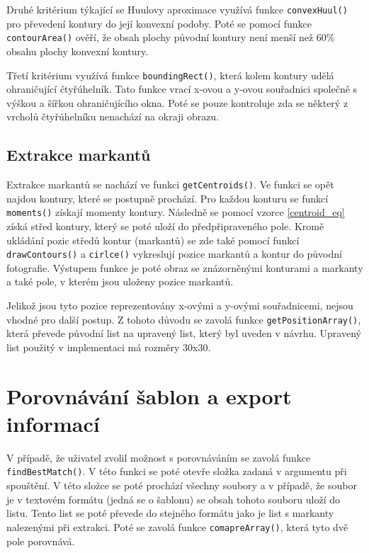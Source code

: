 Druhé kritérium týkající se Huulovy aproximace využívá funkce \texttt{convexHuul()} pro převedení kontury do její konvexní podoby. Poté se pomocí funkce \texttt{contourArea()} ověří, že obsah plochy původní kontury není menší než 60\% obsahu plochy konvexní kontury.

Třetí kritérium využívá funkce \texttt{boundingRect()}, která kolem kontury udělá ohraničující čtyřúhelník. Tato funkce vrací x-ovou a y-ovou souřadnici společně s výškou a šířkou ohraničujícího okna. Poté se pouze kontroluje zda se některý z vrcholů čtyřúhelníku nenachází na okraji obrazu. 


\subsection{Extrakce markantů}

Extrakce markantů se nachází ve funkci \texttt{getCentroids()}. Ve funkci se opět najdou kontury, které se postupně prochází. Pro každou konturu se funkcí \texttt{moments()} získají momenty kontury. Následně se pomocí vzorce \ref{centroid_eq} získá střed kontury, který se poté uloží do předpřipraveného pole. Kromě ukládání pozic středů kontur (markantů) se zde také pomocí funkcí \texttt{drawContours()} a \texttt{cirlce()} vykreslují pozice markantů a kontur do původní fotografie. Výstupem funkce je poté obraz se znázorněnými konturami a markanty a také pole, v kterém jsou uloženy pozice markantů.

Jelikož jsou tyto pozice reprezentovány x-ovými a y-ovými souřadnicemi, nejsou vhodné pro další postup. Z tohoto důvodu se zavolá funkce \texttt{getPositionArray()}, která převede původní list na upravený list, který byl uveden v návrhu. Upravený list použitý v implementaci má rozměry 30x30.



\section{Porovnávání šablon a export informací}
V případě, že uživatel zvolil možnost s porovnáváním se zavolá funkce \texttt{findBestMatch()}. V této funkci se poté otevře složka zadaná v argumentu při spouštění. V této složce se poté prochází všechny soubory a v případě, že soubor je v textovém formátu (jedná se o šablonu) se obsah tohoto souboru uloží do listu. Tento list se poté převede do stejného formátu jako je list s markanty nalezenými při extrakci. Poté se zavolá funkce \texttt{comapreArray()}, která tyto dvě pole porovnává.

